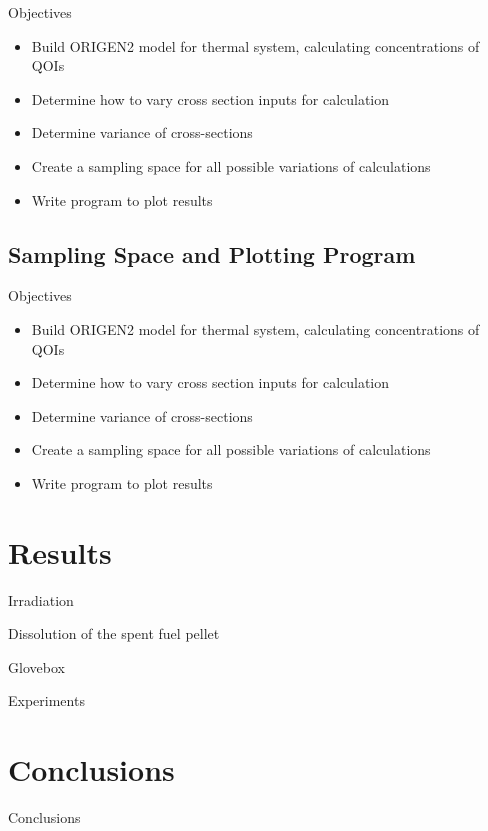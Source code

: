 \documentclass{beamer}
\newcommand{\cmark}{\ding{51}}%
\newcommand{\xmark}{\ding{55}}%
\newcommand{\done}{\rlap{$\square$}{\raisebox{2pt}{\large\hspace{1pt}\cmark}}%
  \hspace{-2.5pt}}
\newcommand{\wontfix}{\rlap{$\square$}{\large\hspace{1pt}\xmark}}
\newcommand{\ndone}{\rlap{$\square$}{\raisebox{2pt}{}}%
  \hspace{8pt}}
\begin{document}
\begin{frame}{Objectives}
  \begin{itemize}
  \item[\done]{Build ORIGEN2 model for thermal system, calculating
  concentrations of QOIs}
  \item[\wontfix]{Determine how to vary cross section inputs for calculation}
  \item[\done]{Determine variance of cross-sections}
  \item[\ndone]{Create a sampling space for all possible variations of
    calculations}
  \item[\ndone]{Write program to plot results}
  \end{itemize}
\end{frame}

\subsection{Sampling Space and Plotting Program}
\begin{frame}

\end{frame}

\begin{frame}{Objectives}
  \begin{itemize}
  \item[\done]{Build ORIGEN2 model for thermal system, calculating
  concentrations of QOIs}
  \item[\wontfix]{Determine how to vary cross section inputs for calculation}
  \item[\done]{Determine variance of cross-sections}
  \item[\done]{Create a sampling space for all possible variations of
    calculations}
  \item[\done]{Write program to plot results}
  \end{itemize}
\end{frame}


\section{Results}
\begin{frame}
\sectionpage
\end{frame}

\begin{frame}{Irradiation}

\end{frame}

\begin{frame}{Dissolution of the spent fuel pellet}

\end{frame}

\begin{frame}{Glovebox}

\end{frame}

\begin{frame}{Experiments}

\end{frame}

\section{Conclusions}
\begin{frame}{Conclusions}

\end{frame}
\end{document}
